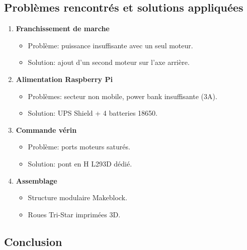 \documentclass[12pt,a4paper]{article}
\begin{document}

\subsection*{Problèmes rencontrés et solutions appliquées}

\begin{enumerate}

\item \textbf{Franchissement de marche}
\begin{itemize}
    \item Problème: puissance insuffisante avec un seul moteur.
    \item Solution: ajout d’un second moteur sur l’axe arrière.
\end{itemize}

\item \textbf{Alimentation Raspberry Pi}
\begin{itemize}
    \item Problèmes: secteur non mobile, power bank insuffisante (3A).
    \item Solution: UPS Shield + 4 batteries 18650.
\end{itemize}

\item \textbf{Commande vérin}
\begin{itemize}
    \item Problème: ports moteurs saturés.
    \item Solution: pont en H L293D dédié.
\end{itemize}

\item \textbf{Assemblage}
\begin{itemize}
    \item Structure modulaire Makeblock.
    \item Roues Tri-Star imprimées 3D.
\end{itemize}

\end{enumerate}


\subsection{Conclusion}
\end{document}
